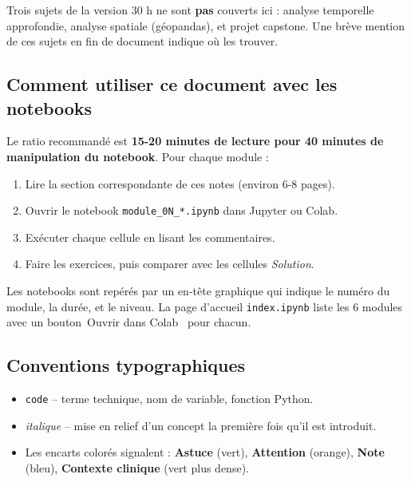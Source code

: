 \documentclass[11pt,a4paper]{article}
\providecommand{\og}{\guillemotleft\,}
\providecommand{\fg}{\,\guillemotright}
\begin{document}
Trois sujets de la version 30 h ne sont \textbf{pas} couverts ici :
analyse temporelle approfondie, analyse spatiale (g\'eopandas), et projet
capstone. Une br\`eve mention de ces sujets en fin de document indique
o\`u les trouver.

\subsection*{Comment utiliser ce document avec les notebooks}

Le ratio recommand\'e est \textbf{15-20 minutes de lecture pour 40 minutes
de manipulation du notebook}. Pour chaque module :

\begin{enumerate}
  \item Lire la section correspondante de ces notes (environ 6-8 pages).
  \item Ouvrir le notebook \texttt{module\_0N\_*.ipynb} dans Jupyter ou
        Colab.
  \item Ex\'ecuter chaque cellule en lisant les commentaires.
  \item Faire les exercices, puis comparer avec les cellules
        \emph{Solution}.
\end{enumerate}

\begin{notebox}
Les notebooks sont rep\'er\'es par un en-t\^ete graphique qui indique le
num\'ero du module, la dur\'ee, et le niveau. La page d'accueil
\texttt{index.ipynb} liste les 6 modules avec un bouton
\og Ouvrir dans Colab \fg{} pour chacun.
\end{notebox}

\subsection*{Conventions typographiques}

\begin{itemize}
  \item \texttt{code} -- terme technique, nom de variable, fonction Python.
  \item \emph{italique} -- mise en relief d'un concept la premi\`ere fois
        qu'il est introduit.
  \item Les encarts color\'es signalent : \textbf{Astuce} (vert),
        \textbf{Attention} (orange), \textbf{Note} (bleu),
        \textbf{Contexte clinique} (vert plus dense).
\end{itemize}

\newpage
\end{document}
